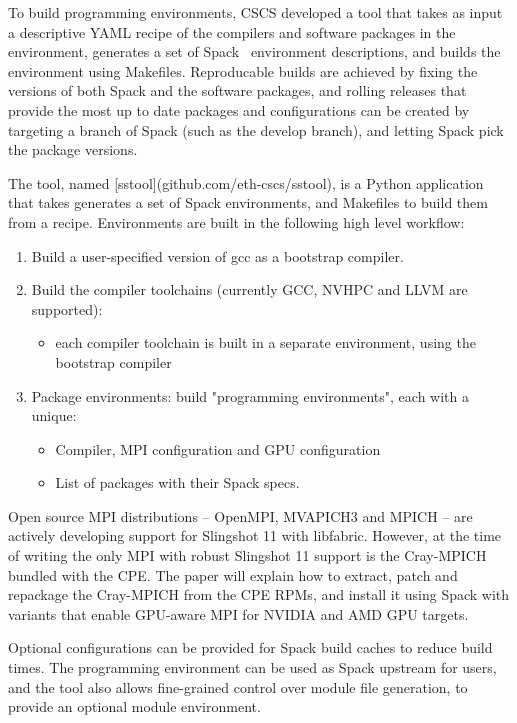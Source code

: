 
To build programming environments, CSCS developed a tool that takes as input a descriptive YAML recipe of the compilers and software packages in the environment, generates a set of Spack~\cite{gamblin:sc15} environment descriptions, and builds the environment using Makefiles.
Reproducable builds are achieved by fixing the versions of both Spack and the software packages, and rolling releases that provide the most up to date packages and configurations can be created by targeting a branch of Spack (such as the develop branch), and letting Spack pick the package versions.

The tool, named [sstool](github.com/eth-cscs/sstool), is a Python application that takes generates a set of Spack environments, and Makefiles to build them from a recipe.
Environments are built in the following high level workflow:
\begin{enumerate}
    \item Build a user-specified version of gcc as a bootstrap compiler.
    \item Build the compiler toolchains (currently GCC, NVHPC and LLVM are supported):
    \begin{itemize}
        \item each compiler toolchain is built in a separate environment, using the bootstrap compiler
    \end{itemize}
    \item Package environments: build "programming environments", each with a unique:
    \begin{itemize}
        \item Compiler, MPI configuration and GPU configuration
        \item List of packages with their Spack specs.
    \end{itemize}
\end{enumerate}

Open source MPI distributions -- OpenMPI, MVAPICH3 and MPICH -- are actively developing support for Slingshot 11 with libfabric.
However, at the time of writing the only MPI with robust Slingshot 11 support is the Cray-MPICH bundled with the CPE.
The paper will explain how to extract, patch and repackage the Cray-MPICH from the CPE RPMs, and install it using Spack with variants that enable GPU-aware MPI for NVIDIA and AMD GPU targets.

Optional configurations can be provided for Spack build caches to reduce build times.
The programming environment can be used as Spack upstream for users, and the tool also allows fine-grained control over module file generation, to provide an optional module environment.
